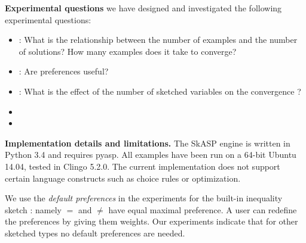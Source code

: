 \textbf{Experimental questions}  we have designed and investigated the following experimental questions:
\begin{itemize}
\item \qone: What is the relationship between the number of examples and the number of solutions? How many examples does it take to converge?
\item \qtwo: Are preferences useful?
\item \qthree: What is the effect of the number of sketched variables on the convergence ?
\item {}
\item {}
\end{itemize}


\textbf{Implementation details and limitations.} The SkASP engine is written in Python 3.4 and requires pyasp. All examples have been run on a 64-bit Ubuntu 14.04, tested in Clingo 5.2.0. The current implementation does not support certain language constructs such as choice rules or optimization. 


We use the \textit{default preferences} in the experiments for the built-in inequality sketch \sketchedeq: namely $=$ and $\neq$ have equal maximal preference. A user can redefine the preferences by giving them weights. Our experiments indicate that for other sketched types no default preferences are needed.




